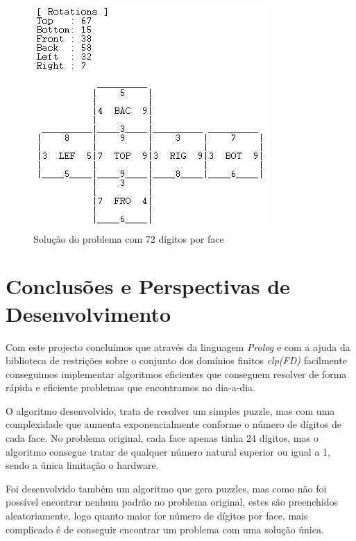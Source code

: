 \begin{figure}[H]
\begin{center}
\includegraphics[scale=0.7]{ex2.png}
\caption{Solução do problema com 72 dígitos por face}
\label{fig:4}
\end{center}
\end{figure}





\section{Conclusões e Perspectivas de Desenvolvimento}
\label{concl}

Com este projecto concluímos que através da linguagem \textit{Prolog} e com a ajuda da biblioteca de restrições sobre o conjunto dos domínios finitos \textit{clp(FD)} facilmente conseguimos implementar algoritmos eficientes que conseguem resolver de forma rápida e eficiente problemas que encontramos no dia-a-dia. 

O algoritmo desenvolvido, trata de resolver um simples puzzle, mas com uma complexidade que aumenta exponencialmente conforme o número de dígitos de cada face. No problema original, cada face apenas tinha 24 dígitos, mas o algoritmo consegue tratar de qualquer número natural superior ou igual a 1, sendo a única limitação o hardware.

Foi desenvolvido também um algoritmo que gera puzzles, mas como não foi possível encontrar nenhum padrão no problema original, estes são preenchidos aleatoriamente, logo quanto maior for número de dígitos por face, mais complicado é de conseguir encontrar um problema com uma solução única.

%

